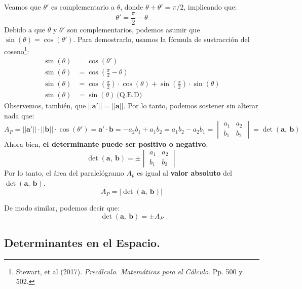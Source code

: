 \documentclass[12pt]{article}
\begin{document}
Veamos que $\theta '$ es complementario a $\theta$, donde $\theta + \theta ' = \pi/2$, implicando que:
\[
  \theta ' = \frac{\pi}{2} - \theta
\]
Debido a que $\theta$ y $\theta '$ son complementarios, podemos asumir que $\sin(\theta) = \cos(\theta ')$. Para demostrarlo, usamos la fórmula de sustracción del coseno\footnote{Stewart, et al (2017). \textit{Precálculo. Matemáticas para el Cálculo}. Pp. 500 y 502.}:
\begin{align*}
\sin(\theta) &= \cos(\theta ') \\
\sin(\theta) &= \cos\left(\frac{\pi}{2} - \theta\right) \\
\sin(\theta) &= \cos\left(\frac{\pi}{2}\right) \cdot \cos(\theta) + \sin\left(\frac{\pi}{2}\right) \cdot \sin(\theta) \\
\sin(\theta) &= \sin(\theta) \ \text{(Q.E.D)}
\end{align*}
Observemos, también, que $||\mathbf{a}'|| = ||\mathbf{a}||$. Por lo tanto, podemos sostener sin alterar nada que:
\[
  A_{P} = ||\mathbf{a}'|| \cdot ||\mathbf{b}|| \cdot \cos(\theta ')
        = \mathbf{a}' \cdot \mathbf{b}
        = -a_{2}b_{1} + a_{1}b_{2}
        = a_{1}b_{2} - a_{2}b_{1}
        = \begin{vmatrix}
          a_{1} &  a_{2} \\
          b_{1} &  b_{2}
          \end{vmatrix}
        = \det(\mathbf{a}, \ \mathbf{b})
\]
Ahora bien, \textbf{el determinante puede ser positivo o negativo}.
\[
\det(\mathbf{a}, \ \mathbf{b}) =
\pm
\begin{vmatrix}
a_{1} &  a_{2} \\
b_{1} &  b_{2}
\end{vmatrix}
\]
Por lo tanto, el área del paralelógramo $A_{p}$ es igual al \textbf{valor absoluto} del $\det(\mathbf{a}, \ \mathbf{b})$.
\[
  A_{P} = |\det(\mathbf{a}, \ \mathbf{b})|
\]

De modo similar, podemos decir que:
\[
  \det(\mathbf{a}, \ \mathbf{b}) = \pm A_{P}
\]

\subsection{Determinantes en el Espacio.}
\end{document}
